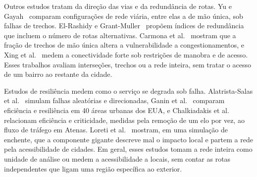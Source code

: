 Outros estudos tratam da direção das vias e da redundância de rotas. Yu e
Gayah~\cite{yu2020resilience} comparam configurações de rede viária, entre
elas a de mão única, sob falhas de trechos. El-Rashidy e
Grant-Muller~\cite{elrashidy2016redundancy} propõem índices de redundância
que incluem o número de rotas alternativas. Carmona et
al.~\cite{carmona2020cracking} mostram que a fração de trechos de mão
única altera a vulnerabilidade a congestionamentos, e Xing et
al.~\cite{xing2025strong} medem a conectividade forte sob restrições de
manobra e de acesso. Esses trabalhos avaliam interseções, trechos ou a rede
inteira, sem tratar o acesso de um bairro ao restante da cidade.

Estudos de resiliência medem como o serviço se degrada sob falha.
Alatrista-Salas et al.~\cite{alatristasalas2019} simulam falhas aleatórias
e direcionadas, Ganin et al.~\cite{ganin2017resilience} comparam eficiência
e resiliência em 40 áreas urbanas dos EUA, e Chalkiadakis et
al.~\cite{chalkiadakis2022resilience} relacionam eficiência e criticidade,
medidas pela remoção de um elo por vez, ao fluxo de tráfego em Atenas.
Loreti et al.~\cite{loreti2022local} mostram, em uma simulação de enchente,
que a componente gigante descreve mal o impacto local e partem a rede pela
acessibilidade de cidades. Em geral, esses estudos tomam a rede inteira
como unidade de análise ou medem a acessibilidade a locais, sem contar as
rotas independentes que ligam uma região específica ao exterior.

